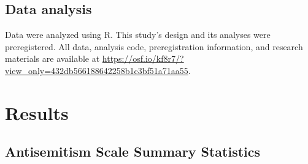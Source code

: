 \documentclass[
  doc,draftall]{apa6}
\begin{document}
\subsection{Data analysis}\label{data-analysis}

Data were analyzed using R. This study's design and its analyses were preregistered. All data, analysis code, preregistration information, and research materials are available at \url{https://osf.io/kf8r7/?view_only=432db566188642258b1c3bf51a71aa55}.

\section{Results}\label{results}

\subsection{Antisemitism Scale Summary Statistics}\label{antisemitism-scale-summary-statistics}
\end{document}
